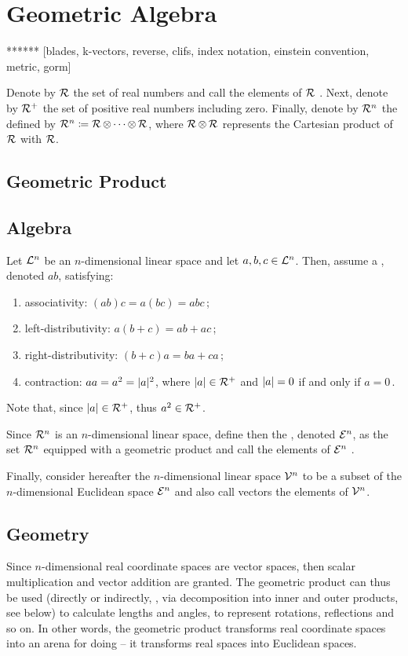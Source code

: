 \section{Geometric Algebra}

****** [blades, k-vectors, reverse, clifs, index notation, einstein convention, metric, gorm]

Denote by $\mathcal{R}$ the set of real numbers and call the elements of $\mathcal{R}$ . Next, denote by $\mathcal{R}^+$ the set of positive real numbers including zero. Finally, denote by $\mathcal{R}^{n}$ the  defined by $\mathcal{R}^{n} \coloneqq \mathcal{R}\operatorname{\otimes}\dotsb\operatorname{\otimes}\mathcal{R}$, where $\mathcal{R}\operatorname{\otimes}\mathcal{R}$ represents the Cartesian product of $\mathcal{R}$ with $\mathcal{R}$.


\subsection{Geometric Product}

\subsection{Algebra}
Let $\mathcal{L}^{n}$ be an $n$-dimensional linear space and let $a,b,c\in\mathcal{L}^{n}$. Then, assume a , denoted $ab$, satisfying:
\begin{enumerate}
\item associativity: $(ab)c = a(bc) = abc$\,;
\item left-distributivity: $a(b + c) = ab + ac$\,;
\item right-distributivity: $(b + c)a = ba + ca$\,;
\item contraction: $aa = a^2 = \lvert{a}\rvert^2$, where $\lvert{a}\rvert\in\mathcal{R}^+$ and $\lvert{a}\rvert = 0$ if and only if $a = 0$\,.
\end{enumerate}
Note that, since $\lvert{a}\rvert\in\mathcal{R}^+$, thus $a^2\in\mathcal{R}^+$.

Since $\mathcal{R}^{n}$ is an $n$-dimensional linear space, define then the , denoted $\mathcal{E}^{n}$, as the set $\mathcal{R}^{n}$ equipped with a geometric product and call the elements of $\mathcal{E}^{n}$ .

Finally, consider hereafter the $n$-dimensional linear space $\mathcal{V}^{n}$ to be a subset of the $n$-dimensional Euclidean space $\mathcal{E}^{n}$ and also call vectors the elements of $\mathcal{V}^{n}$.


\subsection{Geometry}
Since $n$-dimensional real coordinate spaces are vector spaces, then scalar multiplication and vector addition are granted. The geometric product can thus be used (directly or indirectly, \eg, via decomposition into inner and outer products, see below) to calculate lengths and angles, to represent rotations, reflections and so on. In other words, the geometric product transforms real coordinate spaces into an arena for doing  -- it transforms real spaces into Euclidean spaces.


